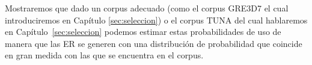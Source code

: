 Mostraremos que dado un corpus adecuado (como el corpus GRE3D7 el cual introduciremos en Cap\'itulo \ref{sec:seleccion}) o el corpus TUNA del cual hablaremos en Cap\'itulo~\ref{sec:seleccion} podemos estimar estas probabilidades de uso de manera que las ER se generen con una distribuci\'on de probabilidad que coincide en gran medida con las que se encuentra en el corpus.




